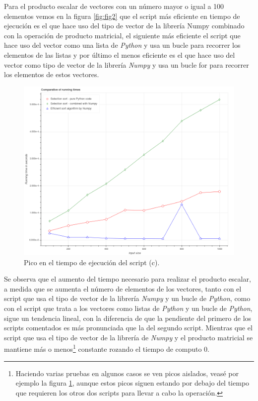 \documentclass[12pt,twoside]{article}
\begin{document}
Para el producto escalar de vectores con un número mayor o igual a 100 elementos vemos en la figura \ref{fig:fig2} que el script más eficiente en tiempo de ejecución es el que hace uso del tipo de vector de la librería Numpy combinado con la operación de producto matricial, el siguiente más eficiente el script que hace uso del vector como una lista de \textit{Python} y usa un bucle para recorrer los elementos de las listas y por último el menos eficiente es el que hace uso del vector como tipo de vector de la librería \textit{Numpy} y usa un bucle for para recorrer los elementos de estos vectores.

\begin{figure}[hbt]
\begin{center}
	\includegraphics[width=1\textwidth]{22.png}
	\caption{Pico en el tiempo de ejecución del script (c).}
	\label{fig:fig3}
\end{center}
\end{figure}

Se observa que el aumento del tiempo necesario para realizar el producto escalar, a medida que se aumenta el número de elementos de los vectores, tanto con el script que usa el tipo de vector de la librería \textit{Numpy} y un bucle de \textit{Python}, como con el script que trata a los vectores como listas de \textit{Python} y un bucle de \textit{Python}, sigue un tendencia lineal, con la diferencia de que la pendiente del primero de los scripts comentados es más pronunciada que la del segundo script. Mientras que el script que usa el tipo de vector de la librería de \textit{Numpy} y el producto matricial se mantiene más o menos\footnote{Haciendo varias pruebas en algunos casos se ven picos aislados, veasé por ejemplo la figura \ref{fig:fig3}, aunque estos picos siguen estando por debajo del tiempo que requieren los otros dos scripts para llevar a cabo la operación.} constante rozando el tiempo de computo 0.
\end{document}
